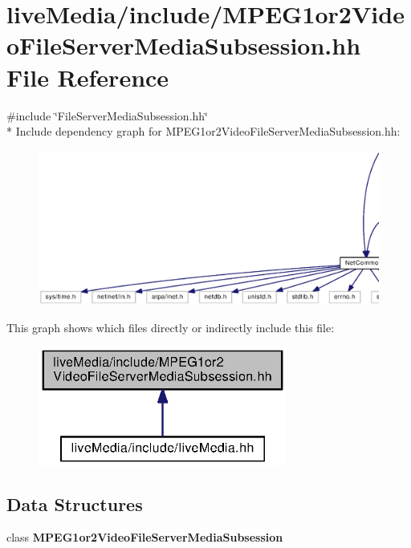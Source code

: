\section{live\+Media/include/\+M\+P\+E\+G1or2\+Video\+File\+Server\+Media\+Subsession.hh File Reference}
\label{MPEG1or2VideoFileServerMediaSubsession_8hh}
{\ttfamily \#include \char`\"{}File\+Server\+Media\+Subsession.\+hh\char`\"{}}\\*
Include dependency graph for M\+P\+E\+G1or2\+Video\+File\+Server\+Media\+Subsession.\+hh\+:
\nopagebreak
\begin{figure}[H]
\begin{center}
\leavevmode
\includegraphics[width=350pt]{MPEG1or2VideoFileServerMediaSubsession_8hh__incl}
\end{center}
\end{figure}
This graph shows which files directly or indirectly include this file\+:
\nopagebreak
\begin{figure}[H]
\begin{center}
\leavevmode
\includegraphics[width=232pt]{MPEG1or2VideoFileServerMediaSubsession_8hh__dep__incl}
\end{center}
\end{figure}
\subsection*{Data Structures}
\begin{DoxyCompactItemize}
\item 
class {\bf M\+P\+E\+G1or2\+Video\+File\+Server\+Media\+Subsession}
\end{DoxyCompactItemize}
